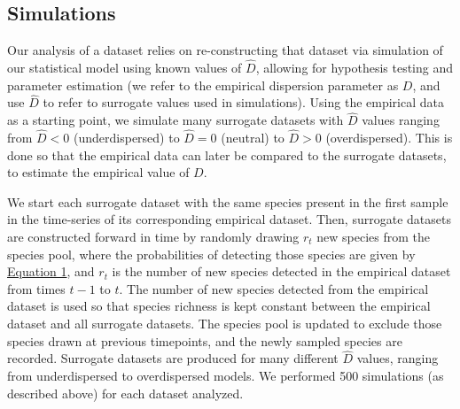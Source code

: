\documentclass{article}
\begin{document}
\subsection{Simulations} \label{sec:simulations}
Our analysis of a dataset relies on re-constructing that dataset via simulation of our statistical model using known values of \(\hat{D}\), allowing for hypothesis testing and parameter estimation (we refer to the empirical dispersion parameter as \(D\), and use \(\hat{D}\) to refer to surrogate values used in simulations). Using the empirical data as a starting point, we simulate many surrogate datasets with \(\hat{D}\) values ranging from \(\hat{D}<0\) (underdispersed) to \(\hat{D}=0\) (neutral) to \(\hat{D}>0\) (overdispersed). This is done so that the empirical data can later be compared to the surrogate datasets, to estimate the empirical value of \(D\).
\par
We start each surrogate dataset with the same species present in the first sample in the time-series of its corresponding empirical dataset. Then, surrogate datasets are constructed forward in time by randomly drawing \(r_t\) new species from the species pool, where the probabilities of detecting those species are given by  \hyperref[sec:equation1]{Equation 1}, and \(r_t\) is the number of new species detected in the empirical dataset from times \(t-1\) to \(t\). The number of new species detected from the empirical dataset is used so that species richness is kept constant between the empirical dataset and all surrogate datasets. The species pool is updated to exclude those species drawn at previous timepoints, and the newly sampled species are recorded. Surrogate datasets are produced for many different \(\hat{D}\) values, ranging from underdispersed to overdispersed models. We performed 500 simulations (as described above) for each dataset analyzed.
\end{document}
